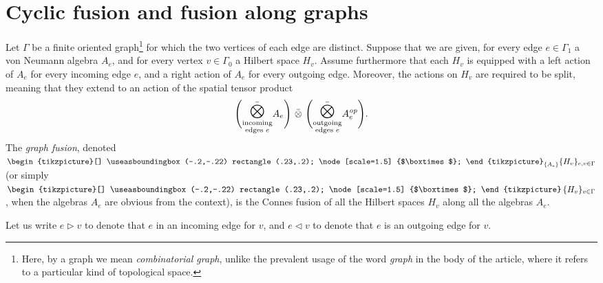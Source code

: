 \documentclass[a4paper,10pt,leqno]{amsart}
\newcommand{\tikzmath}[2][]
     {\vcenter{\hbox{\begin{tikzpicture}[#1]#2
                     \end{tikzpicture}}}
     }
\theoremstyle{plain}
\theoremstyle{definition}
\theoremstyle{remark}
\DeclareMathOperator\bigboxtimes{\tikzmath{
\useasboundingbox (-.2,-.22) rectangle (.23,.2);
\node[scale=1.5] {$\boxtimes$};}}
\newcommand{\op}{{\mathit{op}}}
\renewcommand{\thesubsection}{\arabic{section}.{\sc\alph{subsection}}}
\begin{document}

\appendix

\renewcommand{\thesubsection}{\Alph{section}.{\Roman{subsection}}}

\section{Cyclic fusion and fusion along graphs}
\label{app:Cyclic fusion}

Let $\Gamma$ be a finite oriented graph\footnote{Here, by a graph we mean {\it combinatorial graph}, unlike the prevalent usage of the word \emph{graph} in the body of the article, where it refers to a particular kind of topological space.} for which the two vertices of each edge are distinct.
Suppose that we are given, for every edge $e\in \Gamma_1$ a von Neumann algebra $A_e$, 
and for every vertex $v\in \Gamma_0$ a Hilbert space $H_v$.
Assume furthermore that each $H_v$ is equipped with a left action of $A_e$ for every incoming edge $e$,
and a right action of $A_e$ for every outgoing edge.
Moreover, the actions on $H_v$ are required to be split, meaning that they extend to an action of the spatial tensor product
\[
\Bigg(\raisebox{.1cm}{$\displaystyle\bar{\bigotimes_{\substack{\text{incoming}\\\text{edges } e}}}$} A_e\Bigg)
\,\,\bar\otimes\,\,
\Bigg(\raisebox{.1cm}{$\displaystyle\bar{\bigotimes_{\substack{\text{outgoing}\\\text{edges } e}}}$} A_e^\op\Bigg).
\]
The \emph{graph fusion}, denoted
\(
\bigboxtimes_{\{A_e\}}\{H_v\}_{e,v\in \Gamma}
\) (or simply 
\(
\bigboxtimes\,\{H_v\}_{v\in \Gamma}
\),
when the algebras $A_e$ are obvious from the context),
is the Connes fusion of all the Hilbert spaces $H_v$ along all the algebras $A_e$.

Let us write $e\triangleright v$ to denote that $e$ in an incoming edge for $v$,
and $e\triangleleft v$  to denote that $e$ is an outgoing edge for $v$.
\end{document}
